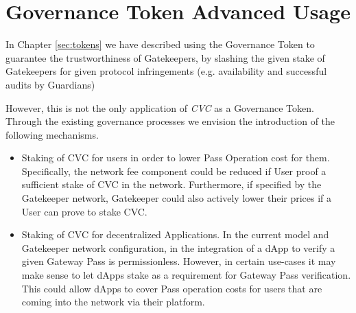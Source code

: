 \section{Governance Token Advanced Usage}\label{sec:gov-token-advanced}
In Chapter \ref{sec:tokens} we have described using the Governance Token to guarantee the trustworthiness of Gatekeepers, by slashing the given stake of Gatekeepers for given protocol infringements (e.g. availability and successful audits by Guardians)

However, this is not the only application of \textit{CVC} as a Governance Token. Through the existing governance processes we envision the introduction of the following mechanisms.

\begin{itemize}
\item Staking of CVC for users in order to lower Pass Operation cost for them. Specifically, the network fee component could be reduced if User proof a sufficient stake of CVC in the network. Furthermore, if specified by the Gatekeeper network, Gatekeeper could also actively lower their prices if a User can prove to stake CVC.
\item Staking of CVC for decentralized Applications. In the current model and Gatekeeper network configuration, in the integration of a dApp to verify a given Gateway Pass is permissionless. However, in certain use-cases it may make sense to let dApps stake as a requirement for Gateway Pass verification. This could allow dApps to cover Pass operation costs for users that are coming into the network via their platform.
\end{itemize}
